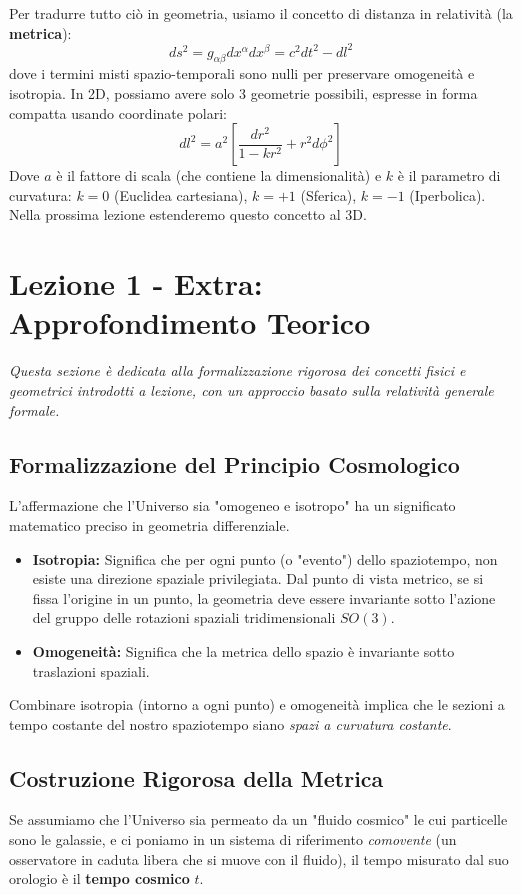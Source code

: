 \documentclass[11pt,a4paper]{report}
\begin{document}
Per tradurre tutto ciò in geometria, usiamo il concetto di distanza in relatività (la \textbf{metrica}):
\begin{equation}
ds^2 = g_{\alpha\beta} dx^\alpha dx^\beta = c^2 dt^2 - dl^2
\end{equation}
dove i termini misti spazio-temporali sono nulli per preservare omogeneità e isotropia. 
In 2D, possiamo avere solo 3 geometrie possibili, espresse in forma compatta usando coordinate polari:
\begin{equation}
dl^2 = a^2 \left[ \frac{dr^2}{1-kr^2} + r^2 d\phi^2 \right]
\end{equation}
Dove $a$ è il fattore di scala (che contiene la dimensionalità) e $k$ è il parametro di curvatura: $k=0$ (Euclidea cartesiana), $k=+1$ (Sferica), $k=-1$ (Iperbolica). Nella prossima lezione estenderemo questo concetto al 3D.

\newpage
\section{Lezione 1 - Extra: Approfondimento Teorico}
\textit{Questa sezione è dedicata alla formalizzazione rigorosa dei concetti fisici e geometrici introdotti a lezione, con un approccio basato sulla relatività generale formale.}

\subsection{Formalizzazione del Principio Cosmologico}
L'affermazione che l'Universo sia "omogeneo e isotropo" ha un significato matematico preciso in geometria differenziale.
\begin{itemize}
    \item \textbf{Isotropia:} Significa che per ogni punto (o "evento") dello spaziotempo, non esiste una direzione spaziale privilegiata. Dal punto di vista metrico, se si fissa l'origine in un punto, la geometria deve essere invariante sotto l'azione del gruppo delle rotazioni spaziali tridimensionali $SO(3)$.
    \item \textbf{Omogeneità:} Significa che la metrica dello spazio è invariante sotto traslazioni spaziali. 
\end{itemize}
Combinare isotropia (intorno a ogni punto) e omogeneità implica che le sezioni a tempo costante del nostro spaziotempo siano \textit{spazi a curvatura costante}. 

\subsection{Costruzione Rigorosa della Metrica}
Se assumiamo che l'Universo sia permeato da un "fluido cosmico" le cui particelle sono le galassie, e ci poniamo in un sistema di riferimento \textit{comovente} (un osservatore in caduta libera che si muove con il fluido), il tempo misurato dal suo orologio è il \textbf{tempo cosmico} $t$. 
\end{document}
